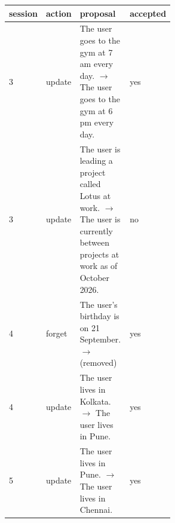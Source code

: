 \begin{tabular}{llp{0.55\linewidth}l}
\toprule
session & action & proposal & accepted \\
\midrule
3 & update & The user goes to the gym at 7 am every day. $\rightarrow$ The user goes to the gym at 6 pm every day. & yes \\
3 & update & The user is leading a project called Lotus at work. $\rightarrow$ The user is currently between projects at work as of October 2026. & no \\
4 & forget & The user's birthday is on 21 September. $\rightarrow$ (removed) & yes \\
4 & update & The user lives in Kolkata. $\rightarrow$ The user lives in Pune. & yes \\
5 & update & The user lives in Pune. $\rightarrow$ The user lives in Chennai. & yes \\
\bottomrule
\end{tabular}
